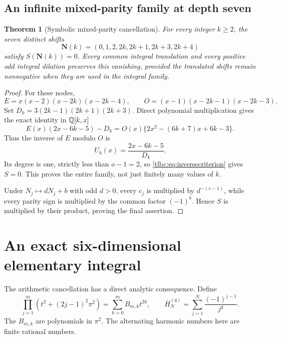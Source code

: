 \documentclass[11pt,letterpaper]{article}
\numberwithin{equation}{section}
\newtheorem{theorem}{Theorem}[section]
\theoremstyle{definition}\newtheorem{definition}[theorem]{Definition}
\theoremstyle{remark}\newtheorem{remark}[theorem]{Remark}
\begin{document}
\subsection{An infinite mixed-parity family at depth seven}
\begin{theorem}[Symbolic mixed-parity cancellation]\label{tlbc:thm:family}
For every integer $k\ge2$, the seven distinct shifts
\begin{equation}\label{tlbc:eq:family}
 \boldsymbol N(k)=(0,1,2,2k,2k+1,2k+3,2k+4)
\end{equation}
satisfy $S(\boldsymbol N(k))=0$. Every common integral translation and every positive odd integral dilation preserves this vanishing, provided the translated shifts remain nonnegative when they are used in the integral family.
\end{theorem}
\begin{proof}
For these nodes,
\[
 E=x(x-2)(x-2k)(x-2k-4),\qquad
 O=(x-1)(x-2k-1)(x-2k-3).
\]
Set $D_k=3(2k-1)(2k+1)(2k+3)$. Direct polynomial multiplication gives the exact identity in $\mathbb Q[k,x]$
\begin{equation}\label{tlbc:eq:Bezout}
 E(x)(2x-6k-5)-D_k
 =O(x)\{2x^2-(6k+7)x+6k-3\}.
\end{equation}
Thus the inverse of $E$ modulo $O$ is
\begin{equation}\label{tlbc:eq:Ufamily}
 U_k(x)=\frac{2x-6k-5}{D_k}.
\end{equation}
Its degree is one, strictly less than $o-1=2$, so \eqref{tlbc:eq:inversecriterion} gives $S=0$. This proves the entire family, not just finitely many values of $k$.

Under $N_j\mapsto dN_j+b$ with odd $d>0$, every $c_j$ is multiplied by $d^{-(r-1)}$, while every parity sign is multiplied by the common factor $(-1)^b$. Hence $S$ is multiplied by their product, proving the final assertion.
\end{proof}

\section{An exact six-dimensional elementary integral}
\label{tlbc:sec:example}
The arithmetic cancellation has a direct analytic consequence. Define
\begin{equation}\label{tlbc:eq:Bcentral}
 \prod_{j=1}^m(t^2+(2j-1)^2\pi^2)
 =\sum_{k=0}^m B_{m,k}t^{2k},\qquad
 \overline H_N^{(q)}=\sum_{j=1}^N\frac{(-1)^{j-1}}{j^q}.
\end{equation}
The $B_{m,k}$ are polynomials in $\pi^2$. The alternating harmonic numbers here are finite rational numbers.
\end{document}
